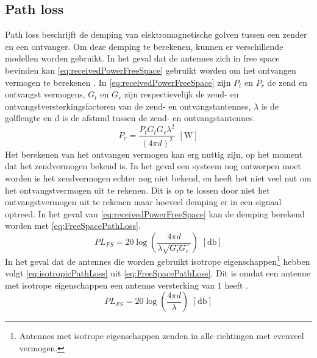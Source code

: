 \subsection{Path loss}
Path loss beschrijft de demping van elektromagnetische golven tussen een zender en een ontvanger. Om deze demping te berekenen, kunnen er verschillende modellen worden gebruikt. In het geval dat de antennes zich in free space bevinden kan \autoref{eq:receivedPowerFreeSpace} gebruikt worden om het ontvangen vermogen te berekenen \cite[13]{bensky2019shortRangeWirelessCommunication}. In \autoref{eq:receivedPowerFreeSpace} zijn \(P_t\) en \(P_r\) de zend en ontvangst vermogens, \(G_t\) en \(G_r\) zijn respectievelijk de zend- en ontvangstversterkingsfactoren van de zend- en ontvangstantennes, \(\lambda\) is de golflengte en d is de afstand tussen de zend- en ontvangstantennes. 
\begin{equation}\label{eq:receivedPowerFreeSpace}
    P_r=\frac{P_tG_tG_r\lambda^2}{\left(4\pi d\right)^2} \,\,\left[\unit{\watt}\right]
\end{equation}
Het berekenen van het ontvangen vermogen kan erg nuttig zijn, op het moment dat het zendvermogen bekend is. In het geval een systeem nog ontworpen moet worden is het zendvermogen echter nog niet bekend, en heeft het niet veel nut om het ontvangstvermogen uit te rekenen. Dit is op te lossen door niet het ontvangstvermogen uit te rekenen maar hoeveel demping er in een signaal optreed. In het geval van \autoref{eq:receivedPowerFreeSpace} kan de demping berekend worden met \autoref{eq:FreeSpacePathLoss}.
\begin{equation}\label{eq:FreeSpacePathLoss}
    PL_{FS}=20\log\left(\frac{4\pi d}{\lambda\sqrt{G_tG_r}}\right) \,\,\left[\unit{\decibel}\right]
\end{equation}
In het geval dat de antennes die worden gebruikt isotrope eigenschappen\footnote{Antennes met isotrope eigenschappen zenden in alle richtingen met evenveel vermogen.} hebben volgt \autoref{eq:isotropicPathLoss} uit \autoref{eq:FreeSpacePathLoss}. Dit is omdat een antenne met isotrope eigenschappen een antenne versterking van $1$ heeft \cite{bensky2019shortRangeWirelessCommunication}.
\begin{equation} \label{eq:isotropicPathLoss}
    PL_{FS}=20\log\left(\frac{4\pi d}{\lambda}\right) \,\,\left[\unit{\decibel}\right]
\end{equation}

